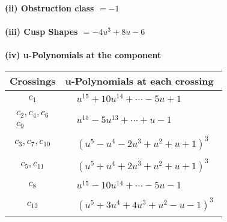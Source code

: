 \documentclass[1p]{elsarticle_modified}
\theoremstyle{definition}
\begin{document}
\flushleft \textbf{(ii) Obstruction class $= -1$}\\~\\
\flushleft \textbf{(iii) Cusp Shapes $= -4 u^3+8 u-6$}\\~\\
\newpage\renewcommand{\arraystretch}{1}
\flushleft \textbf{(iv) u-Polynomials at the component}\newline \\
\begin{tabular}{m{50pt}|m{274pt}}
Crossings & \hspace{64pt}u-Polynomials at each crossing \\
\hline $$\begin{aligned}c_{1}\end{aligned}$$&$\begin{aligned}
&u^{15}+10 u^{14}+\cdots-5 u+1
\end{aligned}$\\
\hline $$\begin{aligned}c_{2},c_{4},c_{6}\\c_{9}\end{aligned}$$&$\begin{aligned}
&u^{15}-5 u^{13}+\cdots+u-1
\end{aligned}$\\
\hline $$\begin{aligned}c_{3},c_{7},c_{10}\end{aligned}$$&$\begin{aligned}
&(u^5- u^4-2 u^3+u^2+u+1)^3
\end{aligned}$\\
\hline $$\begin{aligned}c_{5},c_{11}\end{aligned}$$&$\begin{aligned}
&(u^5+u^4+2 u^3+u^2+u+1)^3
\end{aligned}$\\
\hline $$\begin{aligned}c_{8}\end{aligned}$$&$\begin{aligned}
&u^{15}-10 u^{14}+\cdots-5 u-1
\end{aligned}$\\
\hline $$\begin{aligned}c_{12}\end{aligned}$$&$\begin{aligned}
&(u^5+3 u^4+4 u^3+u^2- u-1)^3
\end{aligned}$\\
\hline
\end{tabular}\\~\\
\end{document}
